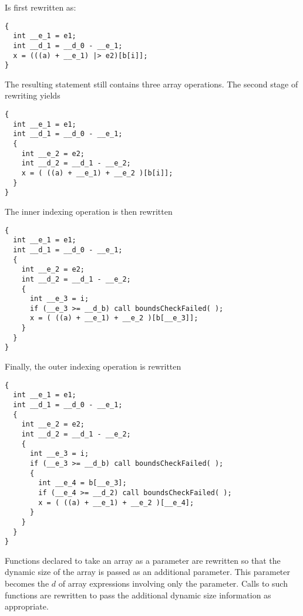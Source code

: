 Is first rewritten as:

\singlespace
\begin{lstlisting}[language=nesC]
{
  int __e_1 = e1;
  int __d_1 = __d_0 - __e_1;
  x = (((a) + __e_1) |> e2)[b[i]];
}
\end{lstlisting}
\primaryspacing

The resulting statement still contains three array operations. The second stage of rewriting
yields

\singlespace
\begin{lstlisting}[language=nesC]
{
  int __e_1 = e1;
  int __d_1 = __d_0 - __e_1;
  {
    int __e_2 = e2;
    int __d_2 = __d_1 - __e_2;
    x = ( ((a) + __e_1) + __e_2 )[b[i]];
  }
}
\end{lstlisting}
\primaryspacing

The inner indexing operation is then rewritten

\singlespace
\begin{lstlisting}[language=nesC]
{
  int __e_1 = e1;
  int __d_1 = __d_0 - __e_1;
  {
    int __e_2 = e2;
    int __d_2 = __d_1 - __e_2;
    {
      int __e_3 = i;
      if (__e_3 >= __d_b) call boundsCheckFailed( );
      x = ( ((a) + __e_1) + __e_2 )[b[__e_3]];
    }
  }
}
\end{lstlisting}
\primaryspacing

Finally, the outer indexing operation is rewritten

\singlespace
\begin{lstlisting}[language=nesC]
{
  int __e_1 = e1;
  int __d_1 = __d_0 - __e_1;
  {
    int __e_2 = e2;
    int __d_2 = __d_1 - __e_2;
    {
      int __e_3 = i;
      if (__e_3 >= __d_b) call boundsCheckFailed( );
      {
        int __e_4 = b[__e_3];
        if (__e_4 >= __d_2) call boundsCheckFailed( );
        x = ( ((a) + __e_1) + __e_2 )[__e_4];
      }
    }
  }
}
\end{lstlisting}
\primaryspacing


Functions declared to take an array as a parameter are rewritten so that the dynamic size of the
array is passed as an additional parameter. This parameter becomes the $d$ of array expressions
involving only the parameter. Calls to such functions are rewritten to pass the additional
dynamic size information as appropriate.

